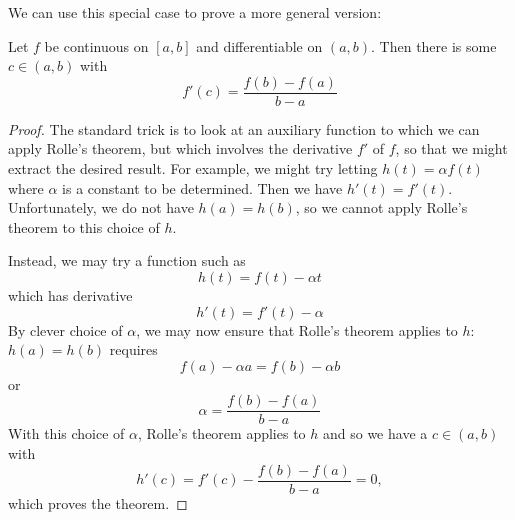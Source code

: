 We can use this special case to prove a more general version:
\begin{theorem}
Let $f$ be continuous on $\left[a,b\right]$ and differentiable on $\left(a,b\right)$. Then there is some $c\in\left(a,b\right)$ with $$ f'\left(c\right) = \frac{f\left(b\right)-f\left(a\right)}{b-a} $$
\end{theorem}
\begin{proof}
The standard trick is to look at an auxiliary function to which we can apply Rolle's theorem, but which involves the derivative $f'$ of $f$, so that we might extract the desired result. For example, we might try letting $h\left(t\right) = \alpha f \left(t\right) $ where $\alpha$ is a constant to be determined. Then we have $h'\left(t\right) = f'\left(t\right) $. Unfortunately, we do not have $h\left(a\right) = h\left(b\right)$, so we cannot apply Rolle's theorem to this choice of $h$.

Instead, we may try a function such as $$ h\left(t\right) = f\left(t\right) - \alpha t $$ which has derivative $$ h'\left(t\right) = f'\left(t\right) - \alpha $$ By clever choice of $\alpha$, we may now ensure that Rolle's theorem applies to $h$: $h\left(a\right) = h\left(b\right)$ requires $$ f\left(a\right) - \alpha a = f\left(b\right) - \alpha b $$ or $$ \alpha = \frac{f\left(b\right) - f\left(a\right)}{b-a} $$ With this choice of $\alpha$, Rolle's theorem applies to $h$ and so we have a $c\in\left(a,b\right)$ with $$ h'\left(c\right) = f'\left(c\right) - \frac{f\left(b\right) - f\left(a\right)}{b-a} = 0, $$ which proves the theorem.
\end{proof}



